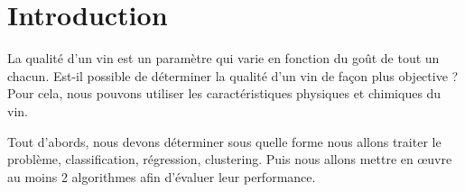 \chapter{Introduction}
\label{chap:intro}

La qualité d'un vin est un paramètre qui varie en fonction du goût de tout un chacun. Est-il possible de déterminer la qualité
d'un vin de façon plus objective ? Pour cela, nous pouvons utiliser les caractéristiques physiques et chimiques du vin.

Tout d'abords, nous devons déterminer sous quelle forme nous allons traiter le problème, classification, régression, clustering.
Puis nous allons mettre en œuvre au moins 2 algorithmes afin d'évaluer leur performance.
